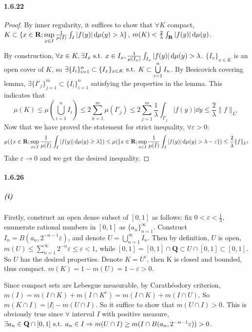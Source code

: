 \documentclass{article}
\begin{document}
\paragraph{1.6.22}
\begin{proof}
By inner regularity, it suffices to show that $\forall K$ compact, $K\subset \{x\in\mathbf{R};\sup\limits_{x\in I}\frac{1}{\mu(I)}\int_{I}|f(y)|\,\mathrm{d}\mu(y)>\lambda\}$, $m(K)<\frac{2}{\lambda}\int_{\mathbf{R}}|f(y)|\,\mathrm{d}\mu(y)$.

By construction, $\forall x\in K, \exists I_x\text{ s.t. } x\in I_x, \frac{1}{\mu(I_x)}\int_{I_x}|f(y)|\,\mathrm{d}\mu(y)>\lambda$. $\{I_x\}_{x\in K}$ is an open cover of $K$, so $\exists \{I_i\}_{i=1}^n\subset \{I_x\}_{x\in K}\text{ s.t. } K\subset \bigcup\limits_{i=1}^n I_n$. By Besicovich covering lemma, $\exists \{I'_j\}_{j=1}^m\subset \{I_i\}_{i=1}^n$ satisfying the properties in the lemma. This indicates that
\[\mu(K)\leq \mu(\bigcup_{i=1}^n I_i)\leq 2\sum_{k=1}^m \mu(I'_j)\leq 2\sum_{j=1}^m \frac{1}{\lambda}\int_{I'_j}|f(y)|\dd y\leq \frac{2}{\lambda}\|f\|_{L^1}\]
Now that we have proved the statement for strict inequality, $\forall\varepsilon>0:$
\[\mu(\{x\in\mathbf{R};\sup\limits_{x\in I}\frac{1}{\mu(I)}\int_{I}|f(y)|\,\mathrm{d}\mu(y)\geq\lambda\})\leq \mu(\{x\in\mathbf{R};\sup\limits_{x\in I}\frac{1}{\mu(I)}\int_{I}|f(y)|\,\mathrm{d}\mu(y)>\lambda-\varepsilon\})\leq \frac 2 \lambda \|f\|_{L^1}\]
Take $\varepsilon\to 0$ and we get the desired inequality.
\end{proof}

\paragraph{1.6.26}
\subparagraph{(i)}

Firstly, construct an open dense subset of $[0,1]$ as follows: fix $0<\varepsilon<\frac 1 3$, enumerate rational numbers in $[0,1]$ as $\{a_n\}_{n=1}^{\infty}$. Construct $I_n=B(a_n,2^{-n-1}\varepsilon)$, and denote $U=\bigcup\limits_{n=1}^\infty I_n$. Then by definition, $U$ is open, $m(U)\leq\sum\limits_{n=1}^{\infty}2^{-n}\varepsilon\leq\varepsilon<1$, while $[0,1]=\overline{[0,1]\cap \mathbf{Q}}\subset \overline{U\cap [0,1]}\subset [0,1]$. So $U$ has the desired properties. Denote $K=U^c$, then K is closed and bounded, thus compact. $m(K)=1-m(U)=1-\varepsilon>0$.

Since compact sets are Lebesgue measurable, by Carath\'eodory criterion, $m(I)=m(I\cap K)+m(I\cap K^c)=m(I\cap K)+m(I\cap U)$. So $m(K\cap I)=|I|-m(U\cap I)$. So it suffice to show that $m(U\cap I)>0$. This is obviously true since $\forall$ interval $I$ with positive measure, $\exists a_n\in\mathbf{Q}\cap [0,1]\text{ s.t. } a_n\in I\Rightarrow m(U\cap I)\geq m(I\cap B(a_n,2^{-n-1}\varepsilon))>0$.
\end{document}
